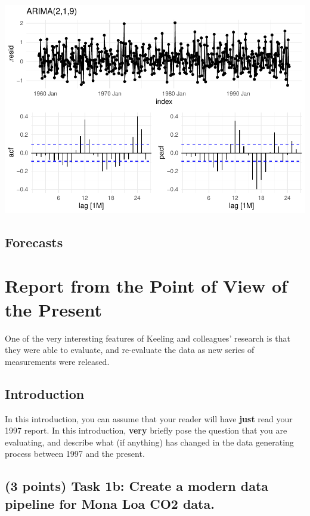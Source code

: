 \documentclass[AER]{AEA}
\begin{document}
\includegraphics{Lab2_Group_report_files/figure-latex/unnamed-chunk-11-1.pdf}

\hypertarget{forecasts}{%
\subsection{Forecasts}\label{forecasts}}

\hypertarget{report-from-the-point-of-view-of-the-present}{%
\section{Report from the Point of View of the
Present}\label{report-from-the-point-of-view-of-the-present}}

One of the very interesting features of Keeling and colleagues' research
is that they were able to evaluate, and re-evaluate the data as new
series of measurements were released.

\hypertarget{introduction}{%
\subsection{Introduction}\label{introduction}}

In this introduction, you can assume that your reader will have
\textbf{just} read your 1997 report. In this introduction, \textbf{very}
briefly pose the question that you are evaluating, and describe what (if
anything) has changed in the data generating process between 1997 and
the present.

\hypertarget{points-task-1b-create-a-modern-data-pipeline-for-mona-loa-co2-data.}{%
\subsection{(3 points) Task 1b: Create a modern data pipeline for Mona
Loa CO2
data.}\label{points-task-1b-create-a-modern-data-pipeline-for-mona-loa-co2-data.}}
\end{document}
